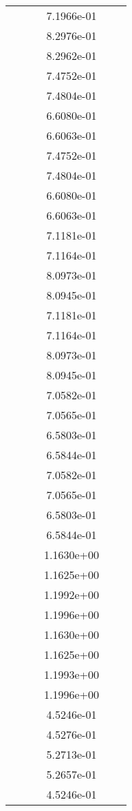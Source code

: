 \begin{xltabular}{\textwidth}{r|rS[table-format=1.3e+2]S[table-format=1.4e+2]S[table-format=1.4e+2]S[table-format=-1.5]}
&  &  & 7.1966e-01 & & \\
&  &  & 8.2976e-01 & & \\
&  &  & 8.2962e-01 & & \\
&  &  & 7.4752e-01 & & \\
&  &  & 7.4804e-01 & & \\
&  &  & 6.6080e-01 & & \\
&  &  & 6.6063e-01 & & \\
&  &  & 7.4752e-01 & & \\
&  &  & 7.4804e-01 & & \\
&  &  & 6.6080e-01 & & \\
&  &  & 6.6063e-01 & & \\
&  &  & 7.1181e-01 & & \\
&  &  & 7.1164e-01 & & \\
&  &  & 8.0973e-01 & & \\
&  &  & 8.0945e-01 & & \\
&  &  & 7.1181e-01 & & \\
&  &  & 7.1164e-01 & & \\
&  &  & 8.0973e-01 & & \\
&  &  & 8.0945e-01 & & \\
&  &  & 7.0582e-01 & & \\
&  &  & 7.0565e-01 & & \\
&  &  & 6.5803e-01 & & \\
&  &  & 6.5844e-01 & & \\
&  &  & 7.0582e-01 & & \\
&  &  & 7.0565e-01 & & \\
&  &  & 6.5803e-01 & & \\
&  &  & 6.5844e-01 & & \\
&  &  & 1.1630e+00 & & \\
&  &  & 1.1625e+00 & & \\
&  &  & 1.1992e+00 & & \\
&  &  & 1.1996e+00 & & \\
&  &  & 1.1630e+00 & & \\
&  &  & 1.1625e+00 & & \\
&  &  & 1.1993e+00 & & \\
&  &  & 1.1996e+00 & & \\
&  &  & 4.5246e-01 & & \\
&  &  & 4.5276e-01 & & \\
&  &  & 5.2713e-01 & & \\
&  &  & 5.2657e-01 & & \\
&  &  & 4.5246e-01 & & \\

\end{xltabular}
